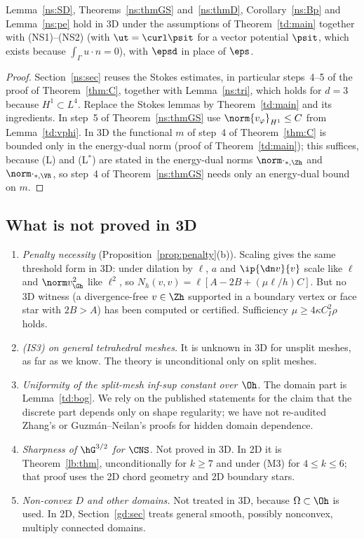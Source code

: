 \begin{corollary}\label{td:ns}
Lemma~\ref{ns:SD}, Theorems~\ref{ns:thmGS} and~\ref{ns:thmD}, Corollary~\ref{ns:Bp} and Lemma~\ref{ns:pe} hold in 3D under the assumptions of Theorem~\ref{td:main} together with (NS1)--(NS2) (with $\ut=\curl\psit$ for a vector potential $\psit$, which exists because $\int_\Gamma u\cdot n=0$), with $\epsd$ in place of $\eps$.
\end{corollary}

\begin{proof}
Section~\ref{ns:sec} reuses the Stokes estimates, in particular steps~4--5 of the proof of Theorem~\ref{thm:C}, together with Lemma~\ref{ns:tri}, which holds for $d=3$ because $H^1\subset L^4$. Replace the Stokes lemmas by Theorem~\ref{td:main} and its ingredients. In step~5 of Theorem~\ref{ns:thmGS} use $\norm{v_\varphi}_{H^1}\le C$ from Lemma~\ref{td:vphi}. In 3D the functional $m$ of step~4 of Theorem~\ref{thm:C} is bounded only in the energy-dual norm (proof of Theorem~\ref{td:main}); this suffices, because (L) and (L$^\ast$) are stated in the energy-dual norms $\norm\cdot_{\ast,\Zh}$ and $\norm\cdot_{\ast,\VR}$, so step~4 of Theorem~\ref{ns:thmGS} needs only an energy-dual bound on $m$.
\end{proof}

\subsection{What is not proved in 3D}\label{td:open}
\begin{enumerate}
\item \emph{Penalty necessity} (Proposition~\ref{prop:penalty}(b)). Scaling gives the same threshold form in 3D: under dilation by $\ell$, $a$ and $\ip{\dn v}{v}$ scale like $\ell$ and $\norm v^2_{\Gh}$ like $\ell^2$, so $N_h(v,v)=\ell[A-2B+(\mu\ell/h)C]$. But no 3D witness (a divergence-free $v\in\Zh$ supported in a boundary vertex or face star with $2B>A$) has been computed or certified. Sufficiency $\mu\ge4\kappa C_I^2\rho$ holds.
\item \emph{(IS3) on general tetrahedral meshes.} It is unknown in 3D for unsplit meshes, as far as we know. The theory is unconditional only on split meshes.
\item \emph{Uniformity of the split-mesh inf-sup constant over $\Oh$.} The domain part is Lemma~\ref{td:bog}. We rely on the published statements for the claim that the discrete part depends only on shape regularity; we have not re-audited Zhang's or Guzm\'an--Neilan's proofs for hidden domain dependence.
\item \emph{Sharpness of $\hG^{3/2}$ for $\CNS$.} Not proved in 3D. In 2D it is Theorem~\ref{lb:thm}, unconditionally for $k\ge7$ and under (M3) for $4\le k\le6$; that proof uses the 2D chord geometry and 2D boundary stars.
\item \emph{Non-convex $D$ and other domains.} Not treated in 3D, because $\Omega\subset\Oh$ is used. In 2D, Section~\ref{gd:sec} treats general smooth, possibly nonconvex, multiply connected domains.
\end{enumerate}
